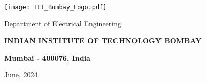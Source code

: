 \begin{titlepage}
\begin{center}
\vfill
\texttt{[image: IIT\_Bombay\_Logo.pdf]}
     \vspace{0.5 cm}

    
    {\large Department of Electrical Engineering\par}
    \vspace{0.2cm}
    {\large \textbf{INDIAN INSTITUTE OF TECHNOLOGY BOMBAY}\par}
    \vspace{0.4cm}
    {\large \textbf{Mumbai - 400076, India}}
    \vspace{0.4cm}
    
    {\Large {June, 2024}}
\end{center}
\end{titlepage}